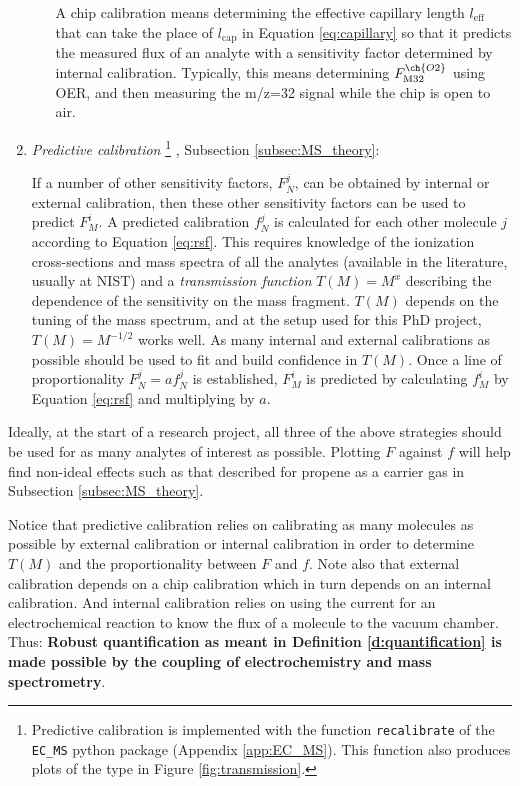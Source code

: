 \begin{enumerate}
\begin{itemize}
	A chip calibration means determining the effective capillary length $l_\text{eff}$ that can take the place of $l_\text{cap}$ in Equation \ref{eq:capillary} so that it predicts the measured flux of an analyte with a sensitivity factor determined by internal calibration. Typically, this means determining $F_\text{M32}^{\ch{O2}}$ using OER, and then measuring the m/z=32 signal while the chip is open to air.
\end{itemize}
\item 
\textit{Predictive calibration}
\footnote{Predictive calibration is implemented with the function \texttt{recalibrate} of the \texttt{EC\_MS} python package (Appendix \ref{app:EC_MS}). This function also produces plots of the type in Figure \ref{fig:transmission}.}
, Subsection \ref{subsec:MS_theory}:

If a number of other sensitivity factors, $F_{N}^{j}$, can be obtained by internal or external calibration, then these other sensitivity factors can be used to predict $F_M^i$. A predicted calibration $f_N^j$ is calculated for each other molecule $j$ according to Equation \ref{eq:rsf}. This requires knowledge of the ionization cross-sections and mass spectra of all the analytes (available in the literature, usually at NIST\cite{NIST}) and a \textit{transmission function} $T(M)=M^x$ describing the dependence of the sensitivity on the mass fragment. $T(M)$ depends on the tuning of the mass spectrum, and at the setup used for this PhD project, $T(M)=M^{-1/2}$ works well. As many internal and external calibrations as possible should be used to fit and build confidence in $T(M)$. Once a line of proportionality $F_N^j = a f_N^j$ is established, $F_M^i$ is predicted by calculating $f_M^i$ by Equation \ref{eq:rsf} and multiplying by $a$.
\end{enumerate}

Ideally, at the start of a research project, all three of the above strategies should be used for as many analytes of interest as possible. Plotting $F$ against $f$ will help find non-ideal effects such as that described for propene as a carrier gas in Subsection \ref{subsec:MS_theory}.

Notice that predictive calibration relies on calibrating as many molecules as possible by external calibration or internal calibration in order to determine $T(M)$ and the proportionality between $F$ and $f$. Note also that external calibration depends on a chip calibration which in turn depends on an internal calibration. And internal calibration relies on using the current for an electrochemical reaction to know the flux of a molecule to the vacuum chamber. Thus: \textbf{Robust quantification as meant in Definition \ref{d:quantification} is made possible by the coupling of electrochemistry and mass spectrometry}.

